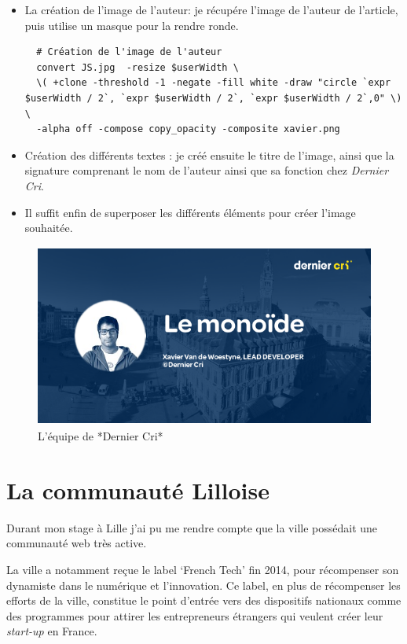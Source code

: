 \documentclass[12pt,a4paper]{article}
\begin{document}
  \begin{itemize}
  \item
    La création de l'image de l'auteur: je récupére l'image de l'auteur de
    l'article, puis utilise un masque pour la rendre ronde.

  \begin{verbatim}
  # Création de l'image de l'auteur
  convert JS.jpg  -resize $userWidth \
  \( +clone -threshold -1 -negate -fill white -draw "circle `expr $userWidth / 2`, `expr $userWidth / 2`, `expr $userWidth / 2`,0" \) \
  -alpha off -compose copy_opacity -composite xavier.png
  \end{verbatim}
  \item
    Création des différents textes : je créé ensuite le titre de l'image,
    ainsi que la signature comprenant le nom de l'auteur ainsi que sa
    fonction chez \emph{Dernier Cri}.
  \item
    Il suffit enfin de superposer les différents éléments pour créer
    l'image souhaitée.
  \end{itemize}

  \begin{figure}[h]
    \centering
    \includegraphics[height=6cm]{figures/blog.png}
    \caption{L'équipe de *Dernier Cri*}
  \end{figure}

  \newpage

  \section{La communauté Lilloise}\label{la-communautuxe9-lilloise}

  Durant mon stage à Lille j'ai pu me rendre compte que la ville possédait
  une communauté web très active.

  \bigskip

  La ville a notamment reçue le label `French Tech' fin 2014, pour
  récompenser son dynamiste dans le numérique et l'innovation. Ce label,
  en plus de récompenser les efforts de la ville, constitue le point
  d'entrée vers des dispositifs nationaux comme des programmes pour
  attirer les entrepreneurs étrangers qui veulent créer leur
  \emph{start-up} en France.
\end{document}
